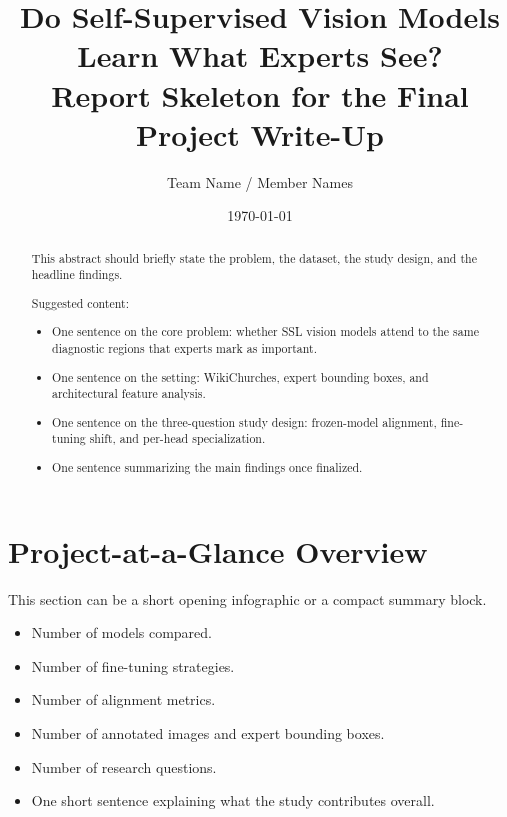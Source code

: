 \documentclass[11pt]{article}
\title{Do Self-Supervised Vision Models Learn What Experts See?\\
\large Report Skeleton for the Final Project Write-Up}
\author{Team Name / Member Names}
\date{\today}
\begin{document}
\maketitle

%

\begin{abstract}
This abstract should briefly state the problem, the dataset, the study design,
and the headline findings.

Suggested content:
\begin{itemize}[leftmargin=1.5em]
    \item One sentence on the core problem: whether SSL vision models attend to
    the same diagnostic regions that experts mark as important.
    \item One sentence on the setting: WikiChurches, expert bounding boxes, and
    architectural feature analysis.
    \item One sentence on the three-question study design: frozen-model
    alignment, fine-tuning shift, and per-head specialization.
    \item One sentence summarizing the main findings once finalized.
\end{itemize}
\end{abstract}

\section{Project-at-a-Glance Overview}

This section can be a short opening infographic or a compact summary block.

\begin{itemize}[leftmargin=1.5em]
    \item Number of models compared.
    \item Number of fine-tuning strategies.
    \item Number of alignment metrics.
    \item Number of annotated images and expert bounding boxes.
    \item Number of research questions.
    \item One short sentence explaining what the study contributes overall.
\end{itemize}
\end{document}
